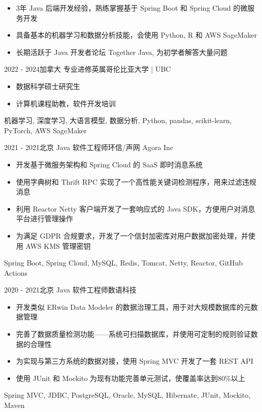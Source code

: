 \documentclass[alternative]{resume_template}
\begin{document}
\makecvheader

\begin{itemize}
    \item 3年 Java 后端开发经验，熟练掌握基于 Spring Boot 和 Spring Cloud 的微服务开发
    \item 具备基本的机器学习和数据分析技能，会使用 Python, R 和 AWS SageMaker
    \item 长期活跃于 Java 开发者论坛 Together Java, 为初学者解答大量问题
\end{itemize}

\begin{experiences}

    \experience
    {2022 - 2024}{加拿大}
    {专业进修}{英属哥伦比亚大学 | UBC}
    {
        \begin{itemize}
            \item 数据科学硕士研究生
            \item 计算机课程助教，软件开发培训
        \end{itemize}
    }
    {机器学习, 深度学习, 大语言模型, 数据分析, Python, pandas, scikit-learn, PyTorch, AWS SageMaker}

    \experience
    {2021 - 2021}{北京}
    {Java 软件工程师}{环信/声网 Agora Inc}
    {
        \begin{itemize}
            \item 开发基于微服务架构和 Spring Cloud 的 SaaS 即时消息系统
            \item 使用字典树和 Thrift RPC 实现了一个高性能关键词检测程序，用来过滤违规消息
            \item 利用 Reactor Netty 客户端开发了一套响应式的 Java SDK，方便用户对消息平台进行管理操作
            \item 为满足 GDPR 合规要求，开发了一个信封加密库对用户数据加密处理，并使用 AWS KMS 管理密钥
        \end{itemize}
    }
    {Spring Boot, Spring Cloud, MySQL, Redis, Tomcat, Netty, Reactor, GitHub Actions}

    \experience
    {2020 - 2021}{北京}
    {Java 软件工程师}{数语科技}
    {
        \begin{itemize}
            \item 开发类似 ERwin Data Modeler 的数据治理工具，用于对大规模数据库的元数据管理
            \item 完善了数据质量检测功能——系统可扫描数据库，并使用可定制的规则验证数据的合理性
            \item 为实现与第三方系统的数据对接，使用 Spring MVC 开发了一套 REST API
            \item 使用 JUnit 和 Mockito 为现有功能完善单元测试，使覆盖率达到80\%以上
        \end{itemize}
    }
    {Spring MVC, JDBC, PostgreSQL, Oracle, MySQL, Hibernate, JUnit, Mockito, Maven}


\end{experiences}
\end{document}
